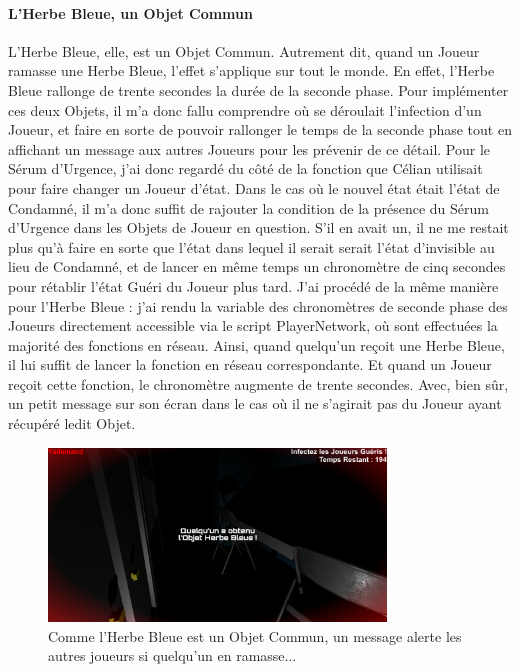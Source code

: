 \documentclass{article}
\begin{document}
\paragraph{L'Herbe Bleue, un Objet Commun}
L'Herbe Bleue, elle, est un Objet Commun. Autrement dit, quand un Joueur ramasse une Herbe Bleue, l'effet s'applique sur tout le monde. En effet, l'Herbe Bleue rallonge de trente secondes la durée de la seconde phase. Pour implémenter ces deux Objets, il m'a donc fallu comprendre où se déroulait l'infection d'un Joueur, et faire en sorte de pouvoir rallonger le temps de la seconde phase tout en affichant un message aux autres Joueurs pour les prévenir de ce détail. Pour le Sérum d'Urgence, j'ai donc regardé du côté de la fonction que Célian utilisait pour faire changer un Joueur d'état. Dans le cas où le nouvel état était l'état de Condamné, il m'a donc suffit de rajouter la condition de la présence du Sérum d'Urgence dans les Objets de Joueur en question. S'il en avait un, il ne me restait plus qu'à faire en sorte que l'état dans lequel il serait serait l'état d'invisible au lieu de Condamné, et de lancer en même temps un chronomètre de cinq secondes pour rétablir l'état Guéri du Joueur plus tard. J'ai procédé de la même manière pour l'Herbe Bleue : j'ai rendu la variable des chronomètres de seconde phase des Joueurs directement accessible via le script PlayerNetwork, où sont effectuées la majorité des fonctions en réseau. Ainsi, quand quelqu'un reçoit une Herbe Bleue, il lui suffit de lancer la fonction en réseau correspondante. Et quand un Joueur reçoit cette fonction, le chronomètre augmente de trente secondes. Avec, bien sûr, un petit message sur son écran dans le cas où il ne s'agirait pas du Joueur ayant récupéré ledit Objet.

\begin{figure}[H]
    \centering
    \includegraphics[width=0.8\textwidth]{MessageHerbeBleue.png}
    \caption{Comme l'Herbe Bleue est un Objet Commun, un message alerte les autres joueurs si quelqu'un en ramasse...}
    \label{Comme l'Herbe Bleue est un Objet Commun, un message alerte les autres joueurs si quelqu'un en ramasse...}
\end{figure}
\end{document}
